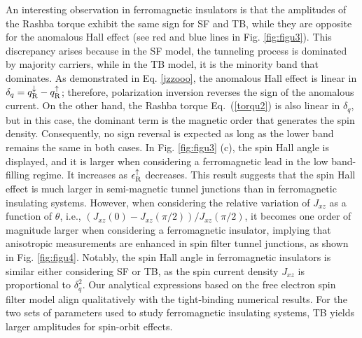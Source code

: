 \documentclass[10pt,pr,twocolumn,showpacs,amssymb,floatfix,superscriptaddress]{revtex4-1}
\newcommand{\dna}{\downarrow}
\newcommand{\upa}{\uparrow}
\newcommand{\eps}{\epsilon}
\begin{document}
An interesting observation in ferromagnetic insulators is that the amplitudes of the Rashba torque exhibit the same sign for SF and TB, while they are opposite for the anomalous Hall effect (see red and blue lines in Fig. \ref{fig:figu3}). This discrepancy arises because in the SF model, the tunneling process is dominated by majority carriers, while in the TB model, it is the minority band that dominates. As demonstrated in Eq. \eqref{jzzooo}, the anomalous Hall effect is linear in $\delta_q = q^\dna_{\rm R} - q^\upa_{\rm R}$; therefore, polarization inversion reverses the sign of the anomalous current. On the other hand, the Rashba torque Eq.~(\ref{torqu2}) is also linear in $\delta_q$, but in this case, the dominant term is the magnetic order that generates the spin density. Consequently, no sign reversal is expected as long as the lower band remains the same in both cases. In  Fig. \ref{fig:figu3} (c), the spin Hall angle is displayed, and it is larger when considering a ferromagnetic lead in the low band-filling regime. It increases as $\eps_{\rm R}^\upa$ decreases. This result suggests that the spin Hall effect is much larger in semi-magnetic tunnel junctions than in ferromagnetic insulating systems. However, when considering the relative variation of $J_{xz}$ as a function of $\theta$, i.e., $(J_{xz}(0) -J_{xz}(\pi/2)) /J_{xz}(\pi/2)$, it becomes one order of magnitude larger when considering a ferromagnetic insulator, implying that anisotropic measurements are enhanced in spin filter tunnel junctions, as shown in Fig. \ref{fig:figu4}. Notably, the spin Hall angle in ferromagnetic insulators is similar either considering SF or TB, as the spin current density $J_{xz}$ is proportional to $\delta_q^2$. Our analytical expressions based on the free electron spin filter model align qualitatively with the tight-binding numerical results. For the two sets of parameters used to study ferromagnetic insulating systems, TB yields larger amplitudes for spin-orbit effects.
\end{document}
